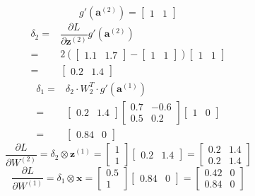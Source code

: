 \documentclass[12pt]{article}
\begin{document}
\begin{enumerate}[font=\Large]
	      $$g'(\mathbf{a}^{(2)})=\begin{bmatrix} 1 & 1 \end{bmatrix}$$
	      $$
		      \begin{aligned}
			      \delta_2= & \dfrac{\partial L}{\partial \textbf{z}^{(2)}} g'(\mathbf{a}^{(2)})                                                 \\
			      =         & 2(\begin{bmatrix} 1.1 & 1.7 \end{bmatrix}-\begin{bmatrix} 1 & 1 \end{bmatrix}) \begin{bmatrix} 1 & 1 \end{bmatrix} \\
			      =         & \begin{bmatrix} 0.2 & 1.4 \end{bmatrix}
		      \end{aligned}$$
	      $$
		      \begin{aligned}
			      \delta_1= & \delta_2\cdot W_2^T\cdot g'(\mathbf{a}^{(1)})                                                                                \\
			      =         & \begin{bmatrix} 0.2 & 1.4 \end{bmatrix}\begin{bmatrix}0.7 & -0.6 \\0.5 & 0.2\end{bmatrix}\begin{bmatrix} 1 & 0 \end{bmatrix} \\
			      =         & \begin{bmatrix} 0.84 & 0 \end{bmatrix}
		      \end{aligned}
	      $$
	      $$\dfrac{\partial L}{\partial W^{(2)}}=\delta_2\otimes\mathbf{z}^{(1)}=\begin{bmatrix} 1 \\ 1 \end{bmatrix}\begin{bmatrix} 0.2 & 1.4 \end{bmatrix}=\begin{bmatrix} 0.2 & 1.4\\ 0.2 & 1.4 \end{bmatrix}$$
	      $$\dfrac{\partial L}{\partial W^{(1)}}=\delta_1\otimes\mathbf{x}=\begin{bmatrix} 0.5 \\ 1 \end{bmatrix}\begin{bmatrix} 0.84 & 0 \end{bmatrix}=\begin{bmatrix} 0.42 & 0\\ 0.84 & 0 \end{bmatrix}$$


\end{enumerate}
\end{document}
